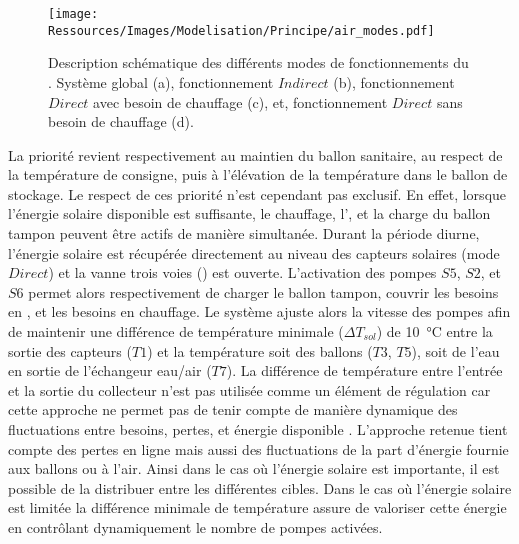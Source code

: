 \begin{figure}[tb]
    \centering
    \texttt{[image: Ressources/Images/Modelisation/Principe/air\_modes.pdf]}
    \caption[Description schématique des différents modes de fonctionnements du ]
            {Description schématique des différents modes de fonctionnements du . Système
             global (a), fonctionnement $Indirect$ (b), fonctionnement $Direct$ avec besoin de
             chauffage (c), et, fonctionnement $Direct$ sans besoin de chauffage (d).}
    \label{fig:schema_modes}
\end{figure}

La priorité revient respectivement au maintien du ballon sanitaire, au respect de la température de
consigne, puis à l’élévation de la température dans le ballon de stockage. Le respect de
ces priorité n’est cependant pas exclusif. En effet, lorsque l’énergie solaire disponible est
suffisante, le chauffage, l’, et la charge du ballon tampon peuvent être actifs de
manière simultanée.
Durant la période diurne, l’énergie solaire est récupérée directement au niveau des
capteurs solaires (mode $Direct$) et la vanne trois voies () est ouverte.
L’activation des pompes $S5$, $S2$, et $S6$ permet alors respectivement de charger le
ballon tampon, couvrir les besoins en , et les besoins en chauffage. Le système
ajuste alors la vitesse des pompes afin de maintenir une différence de température minimale
($\Delta T_{sol}$) de \SI{10}{\celsius} entre la sortie des capteurs ($T1$) et la
température soit des ballons ($T3$, $T5$), soit de l’eau en sortie de l’échangeur eau/air ($T7$).
La différence de
température entre l’entrée et la sortie du collecteur n’est pas utilisée comme un élément
de régulation car cette approche ne permet pas de tenir compte de manière dynamique
des fluctuations entre besoins, pertes, et énergie disponible \parencite{Mosallat2013686}.
L’approche retenue tient compte des pertes en ligne mais aussi des
fluctuations de la part d’énergie fournie aux ballons ou à l’air. Ainsi dans le cas où
l’énergie solaire est importante, il est possible de la distribuer entre les différentes
cibles. Dans le cas où l’énergie solaire est limitée la différence minimale de température
assure de valoriser cette énergie en contrôlant dynamiquement le nombre de pompes activées.

